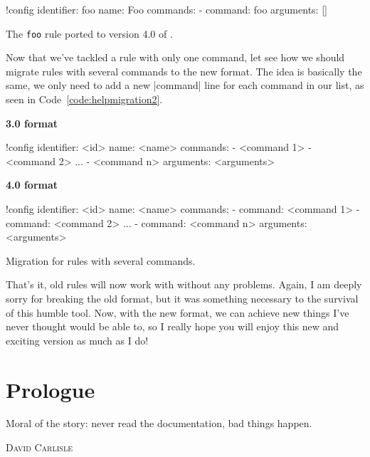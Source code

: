 \documentclass[a4paper,twoside,12pt]{memoir}
\begin{document}
\begin{code}[htbp]
\begin{codelisting}
!config
identifier: foo
name: Foo
commands:
- command: foo
arguments: []
\end{codelisting}
\caption{The \texttt{foo} rule ported to version 4.0 of \arara.}
\label{code:newruleformat}
\end{code}

Now that we've tackled a rule with only one command, let see how we should migrate rules with several commands to the new format. The idea is basically the same, we only need to add a new |command| line for each command in our list, as seen in Code~\ref{code:helpmigration2}.

\begin{code}[htbp]
\begin{minipage}[t]{0.5\textwidth}
{\sffamily\bfseries\color{araracolour} 3.0 format}
\begin{codelisting}
!config
identifier: <id>
name: <name>
commands:
- <command 1>
- <command 2>
...
- <command n>
arguments: <arguments>
\end{codelisting}
\end{minipage}%
\begin{minipage}[t]{0.5\textwidth}
{\sffamily\bfseries\color{araracolour} 4.0 format}
\begin{codelisting}
!config
identifier: <id>
name: <name>
commands:
- command: <command 1>
- command: <command 2>
...
- command: <command n>
arguments: <arguments>
\end{codelisting}
\end{minipage}
\caption{Migration for rules with several commands.}
\label{code:helpmigration2}
\end{code}

That's it, old rules will now work with  without any problems. Again, I am deeply sorry for breaking the old format, but it was something necessary to the survival of this humble tool. Now, with the new format, we can achieve new things I've never thought \arara would be able to, so I really hope you will enjoy this new and exciting version as much as I do!

\chapter*{Prologue}
\label{chap:prologue}

\epigraph{Moral of the story: never read the documentation, bad things happen.}{\textsc{David Carlisle}}
\end{document}
